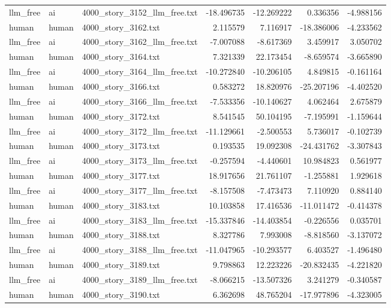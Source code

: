\begin{longtable}{lllrrrr}
llm\_free & ai & 4000\_story\_3152\_llm\_free.txt & -18.496735 & -12.269222 & 0.336356 & -4.988156 \\
human & human & 4000\_story\_3162.txt & 2.115579 & 7.116917 & -18.386006 & -4.233562 \\
llm\_free & ai & 4000\_story\_3162\_llm\_free.txt & -7.007088 & -8.617369 & 3.459917 & 3.050702 \\
human & human & 4000\_story\_3164.txt & 7.321339 & 22.173454 & -8.659574 & -3.665890 \\
llm\_free & ai & 4000\_story\_3164\_llm\_free.txt & -10.272840 & -10.206105 & 4.849815 & -0.161164 \\
human & human & 4000\_story\_3166.txt & 0.583272 & 18.820976 & -25.207196 & -4.402520 \\
llm\_free & ai & 4000\_story\_3166\_llm\_free.txt & -7.533356 & -10.140627 & 4.062464 & 2.675879 \\
human & human & 4000\_story\_3172.txt & 8.541545 & 50.104195 & -7.195991 & -1.159644 \\
llm\_free & ai & 4000\_story\_3172\_llm\_free.txt & -11.129661 & -2.500553 & 5.736017 & -0.102739 \\
human & human & 4000\_story\_3173.txt & 0.193535 & 19.092308 & -24.431762 & -3.307843 \\
llm\_free & ai & 4000\_story\_3173\_llm\_free.txt & -0.257594 & -4.440601 & 10.984823 & 0.561977 \\
human & human & 4000\_story\_3177.txt & 18.917656 & 21.761107 & -1.255881 & 1.929618 \\
llm\_free & ai & 4000\_story\_3177\_llm\_free.txt & -8.157508 & -7.473473 & 7.110920 & 0.884140 \\
human & human & 4000\_story\_3183.txt & 10.103858 & 17.416536 & -11.011472 & -0.414378 \\
llm\_free & ai & 4000\_story\_3183\_llm\_free.txt & -15.337846 & -14.403854 & -0.226556 & 0.035701 \\
human & human & 4000\_story\_3188.txt & 8.327786 & 7.993008 & -8.818560 & -3.137072 \\
llm\_free & ai & 4000\_story\_3188\_llm\_free.txt & -11.047965 & -10.293577 & 6.403527 & -1.496480 \\
human & human & 4000\_story\_3189.txt & 9.798863 & 12.223226 & -20.832435 & -4.221820 \\
llm\_free & ai & 4000\_story\_3189\_llm\_free.txt & -8.066215 & -13.507326 & 3.241279 & -0.340587 \\
human & human & 4000\_story\_3190.txt & 6.362698 & 48.765204 & -17.977896 & -4.323005 \\

\end{longtable}
